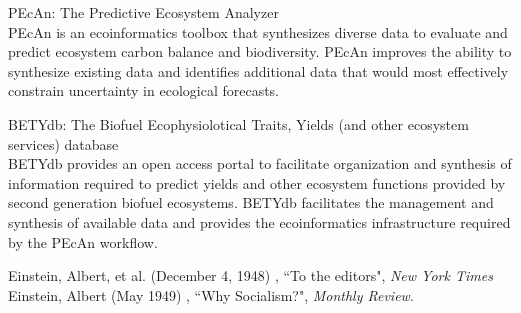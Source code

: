 \documentclass{xetexCV}
\begin{document}

PEcAn: The Predictive Ecosystem Analyzer\\
\hspace{}PEcAn is an ecoinformatics toolbox that synthesizes diverse data to evaluate and predict ecosystem carbon balance and biodiversity. PEcAn improves the ability to synthesize existing data and identifies additional data that would most effectively constrain uncertainty in ecological forecasts.


BETYdb: The Biofuel Ecophysiolotical Traits, Yields (and other ecosystem services) database\\
\hspace{}BETYdb provides an open access portal to facilitate organization and synthesis of information required to predict yields and other ecosystem functions provided by second generation biofuel ecosystems. BETYdb facilitates the management and synthesis of available data and provides the ecoinformatics infrastructure required by the PEcAn workflow. 




Einstein, Albert, et al. (December 4, 1948) , “To the editors", \emph{New York Times}\\
Einstein, Albert (May 1949) , “Why Socialism?", \emph{Monthly Review}.
\end{document}
